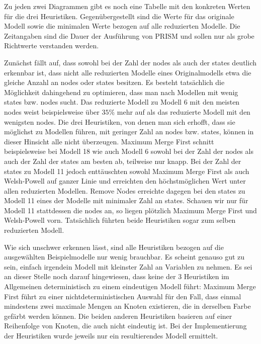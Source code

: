 \documentclass[a4paper]{article}
\theoremstyle{nonumberplain}
\begin{document}
Zu jeden zwei Diagrammen gibt es noch eine Tabelle mit den konkreten Werten für die drei Heuristiken. Gegenübergestellt sind die Werte für das originale Modell sowie die minimalen Werte bezogen auf alle reduzierten Modelle. Die Zeitangaben sind die Dauer der Ausführung von PRISM und sollen nur als grobe Richtwerte verstanden werden.

Zunächst fällt auf, dass sowohl bei der Zahl der nodes als auch der states deutlich erkennbar ist, dass nicht alle reduzierten Modelle eines Originalmodells etwa die gleiche Anzahl an nodes oder states besitzen.
Es besteht tatsächlich die Möglichkeit dahingehend zu optimieren, dass man nach Modellen mit wenig states bzw. nodes sucht. Das reduzierte Modell zu Modell 6 mit den meisten nodes weist beispielsweise über $35\%$ mehr auf als das reduzierte Modell mit den wenigsten nodes.
Die drei Heuristiken, von denen man sich erhofft, dass sie möglichst zu Modellen führen, mit geringer Zahl an nodes bzw. states, können in dieser Hinsicht alle nicht überzeugen.
Maximum Merge First schnitt beispielsweise bei Modell 18 wie auch Modell 6 sowohl bei der Zahl der nodes als auch der Zahl der states am besten ab, teilweise nur knapp. Bei der Zahl der states zu Modell 11 jedoch enttäuschten sowohl Maximum Merge First als auch Welsh-Powell auf ganzer Linie und erreichten den höchstmöglichen Wert unter allen reduzierten Modellen. Remove Nodes erreichte dagegen bei den states zu Modell 11 eines der Modelle mit minimaler Zahl an states. Schauen wir nur für Modell 11 stattdessen die nodes an, so liegen plötzlich Maximum Merge First und Welsh-Powell vorn. Tatsächlich führten beide Heuristiken sogar zum selben reduzierten Modell.

Wie sich unschwer erkennen lässt, sind alle Heuristiken bezogen auf die ausgewählten Beispielmodelle nur wenig brauchbar. Es scheint genauso gut zu sein, einfach irgendein Modell mit kleinster Zahl an Variablen zu nehmen. Es sei an dieser Stelle noch darauf hingewiesen, dass keine der 3 Heuristiken im Allgemeinen deterministisch zu einem eindeutigen Modell führt: Maximum Merge First führt zu einer nichtdeterministischen Auswahl für den Fall, dass einmal mindestens zwei maximale Mengen an Knoten existieren, die in derselben Farbe gefärbt werden können. Die beiden anderen Heuristiken basieren auf einer Reihenfolge von Knoten, die auch nicht eindeutig ist. Bei der Implementierung der Heuristiken wurde jeweils nur ein resultierendes Modell ermittelt.
\end{document}
